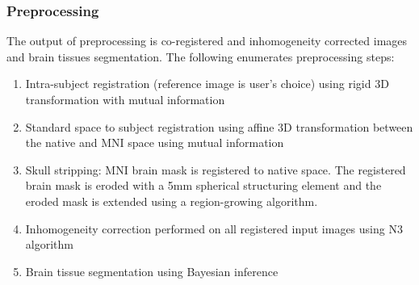 \subsubsection{Preprocessing}
The output of preprocessing is co-registered and inhomogeneity corrected images and brain tissues segmentation. The following enumerates preprocessing steps:
\begin{enumerate}
\item Intra-subject registration (reference image is user’s choice) using rigid 3D transformation with mutual information
\item Standard space to subject registration using affine 3D transformation between the native and MNI space using mutual information
\item Skull stripping: MNI brain mask is registered to native space. The registered brain mask is eroded with a 5mm spherical structuring element and the eroded mask is extended using a region-growing algorithm.
\item Inhomogeneity correction performed on all registered input images using N3 algorithm \cite{N3}
\item Brain tissue segmentation using Bayesian inference
\end{enumerate}
  
  
  
  
  
  